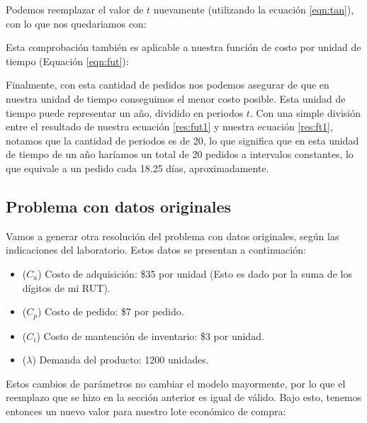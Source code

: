 
Podemos reemplazar el valor de $t$ nuevamente (utilizando la ecuación \ref{eqn:tan}), con lo que nos quedariamos con:


Esta comprobación también es aplicable a nuestra función de costo por unidad de tiempo (Equación \ref{eqn:fut}):


Finalmente, con esta cantidad de pedidos nos podemos asegurar de que en nuestra unidad de tiempo conseguimos el menor costo posible. Esta unidad de tiempo puede representar un año, dividido en periodos $t$. Con una simple división entre el resultado de nuestra ecuación \ref{res:fut1} y nuestra ecuación \ref{res:ft1}, notamos que la cantidad de periodos es de 20, lo que significa que en esta unidad de tiempo de un año haríamos un total de 20 pedidos a intervalos constantes, lo que equivale a un pedido cada 18.25 días, aproximadamente.

\subsection{Problema con datos originales}
Vamos a generar otra resolución del problema con datos originales, según las indicaciones del laboratorio. Estos datos se presentan a continuación:

\begin{itemize}
    \item ($C_a$) Costo de adquisición: \$35 por unidad (Esto es dado por la suma de los dígitos de mi RUT).
    \item ($C_p$) Costo de pedido: \$7 por pedido.
    \item ($C_i$) Costo de mantención de inventario: \$3 por unidad.
    \item ($\lambda$) Demanda del producto: 1200 unidades.
\end{itemize}

Estos cambios de parámetros no cambiar el modelo mayormente, por lo que el reemplazo que se hizo en la sección anterior es igual de válido. Bajo esto, tenemos entonces un nuevo valor para nuestro lote económico de compra:

